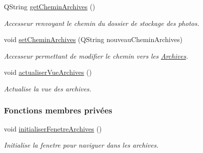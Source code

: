 \begin{DoxyCompactItemize}
Q\+String \hyperlink{class_archives_a65dfbaba0123e6530b03bfb70e614c90}{get\+Chemin\+Archives} ()
\begin{DoxyCompactList}\small\item\em Accesseur renvoyant le chemin du dossier de stockage des photos. \end{DoxyCompactList}\item 
void \hyperlink{class_archives_a899e95a34c2a6f79b9a25355b5bf9cb6}{set\+Chemin\+Archives} (Q\+String nouveau\+Chemin\+Archives)
\begin{DoxyCompactList}\small\item\em Accesseur permettant de modifier le chemin vers les \hyperlink{class_archives}{Archives}. \end{DoxyCompactList}\item 
void \hyperlink{class_archives_a380ac387d773b07ea5138347dbaca65a}{actualiser\+Vue\+Archives} ()
\begin{DoxyCompactList}\small\item\em Actualise la vue des archives. \end{DoxyCompactList}\end{DoxyCompactItemize}
\subsubsection*{Fonctions membres privées}
\begin{DoxyCompactItemize}
\item 
void \hyperlink{class_archives_a1842ebad3721929949bc07be5144b79c}{initialiser\+Fenetre\+Archives} ()
\begin{DoxyCompactList}\small\item\em Initialise la fenetre pour naviguer dans les archives. \end{DoxyCompactList}\end{DoxyCompactItemize}
